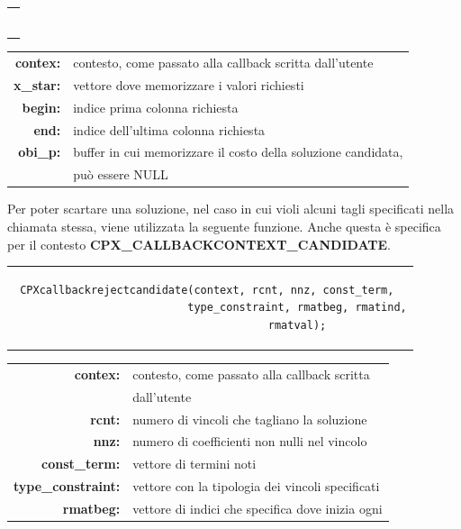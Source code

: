 \begin{center}
\begin{center}
\begin{center}
\begin{tabular}{c}
\begin{lstlisting}[linewidth=385pt, basicstyle=\footnotesize\sffamily,]
\end{lstlisting}
\end{tabular}
\end{center}
\vspace{2cm}
\begin{table}[h]
\centering
\begin{tabular}{rl}
\textbf{contex:} & {contesto, come passato alla callback scritta dall'utente}\\
\textbf{x\_star:} & {vettore dove memorizzare i valori richiesti}\\
\textbf{begin:} & {indice prima colonna richiesta}\\
\textbf{end:} & {indice dell'ultima colonna richiesta}\\
\textbf{obi\_p:} & {buffer in cui memorizzare il costo della soluzione candidata,}\\
&{può essere NULL}\\
\end{tabular}
\end{table}
Per poter scartare una soluzione, nel caso in cui violi alcuni tagli specificati nella chiamata stessa, viene utilizzata la seguente funzione. Anche questa è specifica per il contesto \textbf{CPX\_CALLBACKCONTEXT\_CANDIDATE}.
\begin{center}
\begin{tabular}{c}
\begin{lstlisting}[linewidth=365pt, basicstyle=\footnotesize\sffamily,]    
CPXcallbackrejectcandidate(context, rcnt, nnz, const_term, 
                           type_constraint, rmatbeg, rmatind,
                           rmatval);
\end{lstlisting}
\end{tabular}
\end{center}
\begin{table}[h]
\centering
\begin{tabular}{rl}
\textbf{contex:} & {contesto, come passato alla callback scritta}\\
&{dall'utente}\\
\textbf{rcnt:} & {numero di vincoli che tagliano la soluzione}\\
\textbf{nnz:} & {numero di coefficienti non nulli nel vincolo}\\
\textbf{const\_term:} & {vettore di termini noti}\\
\textbf{type\_constraint:} & {vettore con la tipologia dei vincoli specificati}\\
\textbf{rmatbeg:} & {vettore di indici che specifica dove inizia ogni}\\

\end{tabular}
\end{table}
\end{center}
\end{center}
